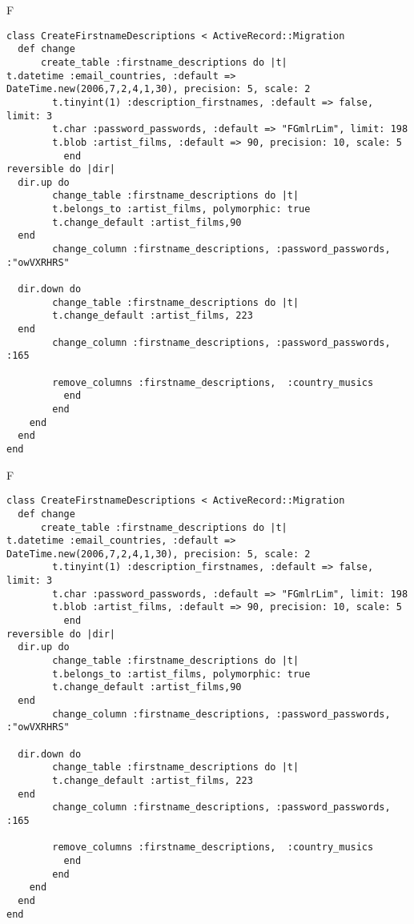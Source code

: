 F
\begin{verbatim}
class CreateFirstnameDescriptions < ActiveRecord::Migration
  def change
	  create_table :firstname_descriptions do |t|
t.datetime :email_countries, :default => DateTime.new(2006,7,2,4,1,30), precision: 5, scale: 2
		t.tinyint(1) :description_firstnames, :default => false, limit: 3
		t.char :password_passwords, :default => "FGmlrLim", limit: 198
		t.blob :artist_films, :default => 90, precision: 10, scale: 5
		  end
reversible do |dir|
  dir.up do
		change_table :firstname_descriptions do |t|
		t.belongs_to :artist_films, polymorphic: true
 		t.change_default :artist_films,90
  end
 		change_column :firstname_descriptions, :password_passwords, :"owVXRHRS"
   
  dir.down do
		change_table :firstname_descriptions do |t|
		t.change_default :artist_films, 223
  end
 		change_column :firstname_descriptions, :password_passwords, :165
   
		remove_columns :firstname_descriptions,  :country_musics 
	      end
	    end
    end 
  end
end

\end{verbatim}

F
\begin{verbatim}
class CreateFirstnameDescriptions < ActiveRecord::Migration
  def change
	  create_table :firstname_descriptions do |t|
t.datetime :email_countries, :default => DateTime.new(2006,7,2,4,1,30), precision: 5, scale: 2
		t.tinyint(1) :description_firstnames, :default => false, limit: 3
		t.char :password_passwords, :default => "FGmlrLim", limit: 198
		t.blob :artist_films, :default => 90, precision: 10, scale: 5
		  end
reversible do |dir|
  dir.up do
		change_table :firstname_descriptions do |t|
		t.belongs_to :artist_films, polymorphic: true
 		t.change_default :artist_films,90
  end
 		change_column :firstname_descriptions, :password_passwords, :"owVXRHRS"
   
  dir.down do
		change_table :firstname_descriptions do |t|
		t.change_default :artist_films, 223
  end
 		change_column :firstname_descriptions, :password_passwords, :165
   
		remove_columns :firstname_descriptions,  :country_musics 
	      end
	    end
    end 
  end
end

\end{verbatim}

